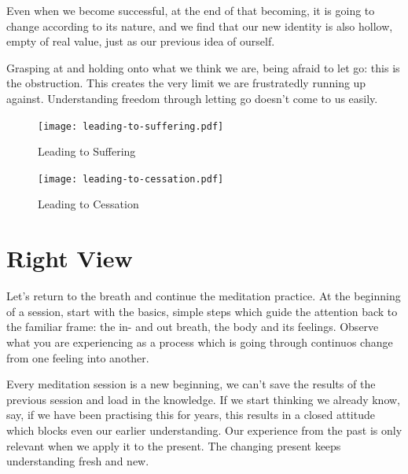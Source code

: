 Even when we become successful, at the end of that becoming, it is going
to change according to its nature, and we find that our new identity is
also hollow, empty of real value, just as our previous idea of ourself.

Grasping at and holding onto what we think we are, being afraid to let
go: this is the obstruction. This creates the very limit we are
frustratedly running up against. Understanding freedom through letting
go doesn't come to us easily.

\cleartoverso

\begin{figure}[h]
\caption{Leading to Suffering}\label{fig-leading-to-suffering}

\centering

\texttt{[image: leading-to-suffering.pdf]}

\end{figure}

\clearpage

\begin{figure}[h]
\caption{Leading to Cessation}\label{fig-leading-to-cessation}

\centering

\texttt{[image: leading-to-cessation.pdf]}

\end{figure}

\clearpage

\section{Right View}


\noindent Let's return to the breath and continue the meditation
practice. At the beginning of a session, start with the basics, simple
steps which guide the attention back to the familiar frame: the in- and
out breath, the body and its feelings. Observe what you are experiencing
as a process which is going through continuos change from one feeling
into another.

Every meditation session is a new beginning, we can't save the results
of the previous session and load in the knowledge. If we start thinking
we already know, say, if we have been practising this for years, this
results in a closed attitude which blocks even our earlier
understanding. Our experience from the past is only relevant when we
apply it to the present. The changing present keeps understanding fresh
and new.

